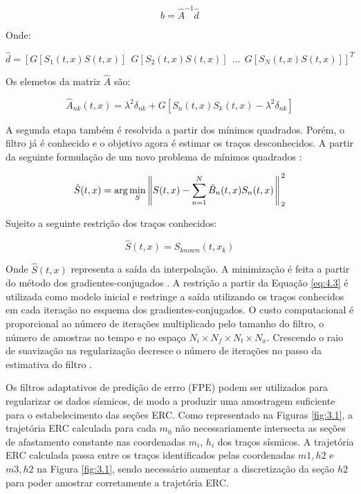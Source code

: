 \begin{equation}
 b = \hat{A}^{-1}\hat{d}
\end{equation}

Onde:

\begin{equation}
 \hat{d} = [ G[S_1(t,x)S(t,x)]\:\: G[S_2(t,x)S(t,x)]\:\: ...\:\: G[S_N(t,x)S(t,x)] ]^T
\end{equation}

Os elemetos da matriz $\hat{A}$ são:

\begin{equation}
 \hat{A}_{nk}(t,x) = \lambda^2 \delta_{nk} + G[S_n(t,x)S_k(t,x) - \lambda^2 \delta_{nk}]
\end{equation}

A segunda etapa também é resolvida a partir dos mínimos quadrados. Porém,
o filtro já é conhecido e o objetivo agora é estimar os traços desconhecidos.
A partir da seguinte formulação de um novo problema de mínimos quadrados \cite{liu11}:

\begin{equation}
\label{eq:4.2}
 \hat{S}(t,x) = \arg \min_S \left \rVert S(t,x) - \sum^N_{n=1}\hat{B}_n(t,x) S_n(t,x) \right \Arrowvert^2_2
\end{equation}

Sujeito a seguinte restrição dos traços conhecidos:

\begin{equation}
\label{eq:4.3}
 \hat{S}(t,x) = S_{known}(t,x_k)
\end{equation}

Onde $\hat{S}(t,x)$ representa a saída da interpolação.
A minimização é feita a partir do método dos gradientes-conjugados \cite{hestenes}. 
A restrição a partir da Equação \ref{eq:4.3} é utilizada como modelo inicial e restringe
a saída utilizando os traços conhecidos em cada iteração no esquema dos gradientes-conjugados.
O custo computacional é proporcional ao número de iterações multiplicado
pelo tamanho do filtro, o número de amostras no tempo e no espaço $N_i \times N_f \times N_t \times N_x$. 
Crescendo o raio de suavização na regularização decresce o número de iterações no passo da
estimativa do filtro \cite{liu11}.

Os filtros adaptativos de predição de errro (FPE) podem ser utilizados para regularizar os dados sísmicos,
de modo a produzir uma amostragem suficiente para o estabelecimento das seções ERC.
Como representado na Figuras \ref{fig:3.1}, a trajetória ERC calculada para cada $m_0$ não
necessariamente intersecta as seções de afastamento constante nas coordenadas $m_i$, $h_i$ dos traços sísmicos. 
A trajetória ERC calculada passa entre os traços identificados pelas coordenadas $m1,h2$ e $m3, h2$ na Figura \ref{fig:3.1},
sendo necessário aumentar a discretização da seção $h2$ para poder amostrar corretamente a trajetória ERC.

